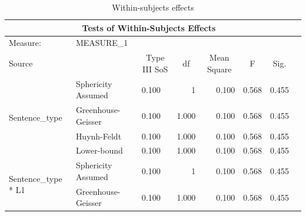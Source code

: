 \documentclass[a4paper]{article}
\begin{document}
\begin{table}[H]
\centering
\caption{Within-subjects effects}
\label{tab:within3}
\begin{tabular}{p{}p{}|l|r|r|r|r|r|} 
\hline
\multicolumn{7}{|c|}{Tests of Within-Subjects Effects}                                                                                                                                                                                         \\ 
\hline
Measure:~                                               & MEASURE\_1         & \multicolumn{1}{l|}{}                        & \multicolumn{1}{l|}{}   & \multicolumn{1}{l|}{}            & \multicolumn{1}{l|}{}  & \multicolumn{1}{l|}{}      \\ 
\hline
Source                                                  & ~                  & \multicolumn{1}{c|}{Type III SoS} & \multicolumn{1}{c|}{df} & \multicolumn{1}{c|}{Mean Square} & \multicolumn{1}{c|}{F} & \multicolumn{1}{c|}{Sig.}  \\ 
\hline
\multirow{4}{*}{Sentence\_type}                         & Sphericity Assumed & 0.100                                        & 1                       & 0.100                            & 0.568                  & 0.455                      \\ 
\cline{2-7}
                                                        & Greenhouse-Geisser & 0.100                                        & 1.000                   & 0.100                            & 0.568                  & 0.455                      \\ 
\cline{2-7}
                                                        & Huynh-Feldt        & 0.100                                        & 1.000                   & 0.100                            & 0.568                  & 0.455                      \\ 
\cline{2-7}
                                                        & Lower-bound        & 0.100                                        & 1.000                   & 0.100                            & 0.568                  & 0.455                      \\ 
\hline
\multirow{4}{*}{Sentence\_type * L1}                    & Sphericity Assumed & 0.100                                        & 1                       & 0.100                            & 0.568                  & 0.455                      \\ 
\cline{2-7}
                                                        & Greenhouse-Geisser & 0.100                                        & 1.000                   & 0.100                            & 0.568                  & 0.455                      \\ 

\end{tabular}
\end{table}
\end{document}
